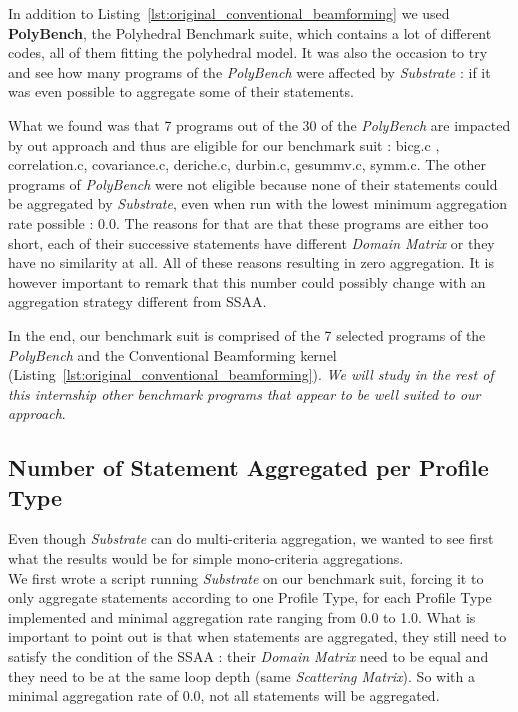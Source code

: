 \documentclass[paper=a4, fontsize=11.5pt]{scrartcl}
\numberwithin{equation}{section}        %
\numberwithin{figure}{section}          %
\numberwithin{table}{section}               %
\begin{document}
\bigskip

In addition to Listing~\ref{lst:original_conventional_beamforming} we used \textbf{PolyBench},
the Polyhedral Benchmark suite, which contains a lot of different codes, all of them fitting
the polyhedral model. It was also the occasion to try and see how many programs of the \textit{PolyBench}
were affected by \textit{Substrate} : if it was even possible to aggregate some of their statements.

What we found was that 7 programs out of the 30 of the \textit{PolyBench} are impacted by
out approach and thus are eligible for our benchmark suit :
bicg.c , correlation.c, covariance.c, deriche.c, durbin.c, gesummv.c, symm.c.
The other programs of \textit{PolyBench} were not eligible because none of their statements could be
aggregated by \textit{Substrate}, even when run with the lowest minimum aggregation rate possible : 0.0.
The reasons for that are that these programs are either too short, each of their
successive statements have different \textit{Domain Matrix} or they have no similarity at all.
All of these reasons resulting in zero aggregation. It is however important to remark that
this number could possibly change with an aggregation strategy different from SSAA.

\bigskip

In the end, our benchmark suit is comprised of the 7 selected programs of the \textit{PolyBench}
and the Conventional Beamforming kernel (Listing~\ref{lst:original_conventional_beamforming}).
\textit{We will study in the rest of this internship other benchmark programs that appear to be
well suited to our approach}.

\subsection{Number of Statement Aggregated per Profile Type}
\label{sec:nb_stmt}

Even though \textit{Substrate} can do multi-criteria aggregation, we wanted to see first what
the results would be for simple mono-criteria aggregations.\\
We first wrote a script running \textit{Substrate} on our benchmark suit, forcing it to
only aggregate statements according to one Profile Type, for each Profile Type implemented
and minimal aggregation rate ranging from 0.0 to 1.0. What is important to point out is that
when statements are aggregated, they still need to satisfy the condition of the SSAA :
their \textit{Domain Matrix} need to be equal and they need to be at the same loop depth
(same \textit{Scattering Matrix}). So with a minimal aggregation rate of 0.0, not all statements
will be aggregated.\\
\end{document}
